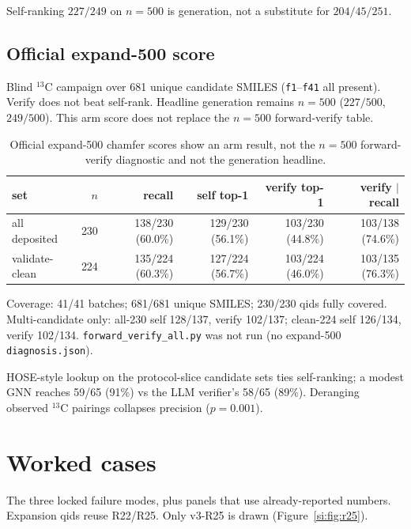 \documentclass[11pt]{article}
\begin{document}
Self-ranking $227/249$ on $n{=}500$ is generation, not a substitute
for $204/45/251$.

\subsection{Official expand-500 score}

Blind $^{13}$C campaign over 681 unique candidate SMILES
(\texttt{f1}--\texttt{f41} all present).
Verify does not beat self-rank.
Headline generation remains $n{=}500$ ($227/500$, $249/500$).
This arm score does not replace the $n{=}500$ forward-verify table.

\begin{table}[h]
\caption{Official expand-500 chamfer scores show an arm result,
not the $n{=}500$ forward-verify diagnostic and not the generation headline.}
\centering
\scriptsize
\setlength{\tabcolsep}{3pt}
\begin{tabular}{@{}lrrrrr@{}}
\toprule
set & $n$ & recall & self top-1 & verify top-1 & verify $|$ recall \\
\midrule
all deposited & 230 & 138/230 (60.0\%) & 129/230 (56.1\%) & 103/230 (44.8\%) & 103/138 (74.6\%) \\
validate-clean & 224 & 135/224 (60.3\%) & 127/224 (56.7\%) & 103/224 (46.0\%) & 103/135 (76.3\%) \\
\bottomrule
\end{tabular}
\end{table}

Coverage: 41/41 batches; 681/681 unique SMILES; 230/230 qids fully
covered. Multi-candidate only: all-230 self 128/137, verify 102/137;
clean-224 self 126/134, verify 102/134.
\texttt{forward\_verify\_all.py} was not run (no expand-500
\texttt{diagnosis.json}).

HOSE-style lookup on the protocol-slice candidate sets ties
self-ranking; a modest GNN reaches 59/65 (91\%) vs the LLM verifier's
58/65 (89\%).
Deranging observed $^{13}$C pairings collapses precision ($p{=}0.001$).

\section{Worked cases}
\label{si:cases}

The three locked failure modes, plus panels that use already-reported
numbers. Expansion qids reuse R22/R25.
Only v3-R25 is drawn (Figure~\ref{si:fig:r25}).
\end{document}
